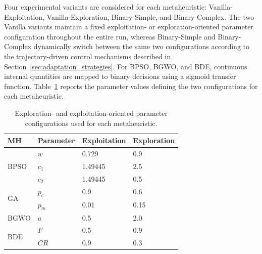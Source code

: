 \documentclass[journal,article,submit,moreauthors]{Definitions/mdpi}
\begin{document}
Four experimental variants are considered for each metaheuristic:
Vanilla-Exploitation, Vanilla-Exploration, Binary-Simple, and Binary-Complex.
The two Vanilla variants maintain a fixed exploitation- or
exploration-oriented parameter configuration throughout the entire run,
whereas Binary-Simple and Binary-Complex dynamically switch between the same
two configurations according to the trajectory-driven control mechanisms
described in Section~\ref{sec:adaptation_strategies}. For BPSO, BGWO, and
BDE, continuous internal quantities are mapped to binary decisions using a
sigmoid transfer function. Table~\ref{tab:mh_params} reports the parameter
values defining the two configurations for each metaheuristic.

\begin{table}[htbp]
\centering
\caption{Exploration- and exploitation-oriented parameter configurations
used for each metaheuristic.}
\label{tab:mh_params}
\begin{tabular}{@{}l l l l@{}}
\toprule
\textbf{MH} &
\textbf{Parameter} &
\textbf{Exploitation} &
\textbf{Exploration} \\
\midrule

\multirow{3}{*}{BPSO}
  & $w$   & 0.729   & 0.9 \\
  & $c_1$ & 1.49445 & 2.5 \\
  & $c_2$ & 1.49445 & 0.5 \\

\midrule

\multirow{2}{*}{GA}
  & $p_c$ & 0.9  & 0.6 \\
  & $p_m$ & 0.01 & 0.15 \\

\midrule

BGWO
  & $a$ & 0.5 & 2.0 \\

\midrule

\multirow{2}{*}{BDE}
  & $F$  & 0.5 & 0.9 \\
  & $CR$ & 0.9 & 0.3 \\

\bottomrule
\end{tabular}
\end{table}
\end{document}
